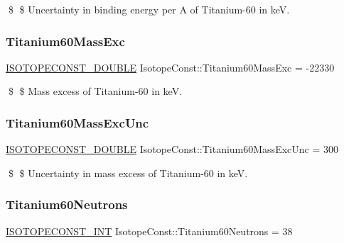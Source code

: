 \$ \$ Uncertainty in binding energy per A of Titanium-\/60 in keV. \mbox{\label{group___isotope_const-_titanium-_ti60_ga45d332f9e6dccb91611e66ee8d34ff87}} 
\subsubsection{\texorpdfstring{Titanium60\+Mass\+Exc}{Titanium60MassExc}}
{\footnotesize\ttfamily \mbox{\hyperlink{group___isotope_const-_macros_ga8f45a7272ce02c0b4c65c44636ed719a}{I\+S\+O\+T\+O\+P\+E\+C\+O\+N\+S\+T\+\_\+\+D\+O\+U\+B\+LE}} Isotope\+Const\+::\+Titanium60\+Mass\+Exc = -\/22330}

\$ \$ Mass excess of Titanium-\/60 in keV. \mbox{\label{group___isotope_const-_titanium-_ti60_ga9fed32165e86d8d64e4fe741c67272ba}} 
\subsubsection{\texorpdfstring{Titanium60\+Mass\+Exc\+Unc}{Titanium60MassExcUnc}}
{\footnotesize\ttfamily \mbox{\hyperlink{group___isotope_const-_macros_ga8f45a7272ce02c0b4c65c44636ed719a}{I\+S\+O\+T\+O\+P\+E\+C\+O\+N\+S\+T\+\_\+\+D\+O\+U\+B\+LE}} Isotope\+Const\+::\+Titanium60\+Mass\+Exc\+Unc = 300}

\$ \$ Uncertainty in mass excess of Titanium-\/60 in keV. \mbox{\label{group___isotope_const-_titanium-_ti60_gaaca5084dd865e04dcb7c35b34205d5a7}} 
\subsubsection{\texorpdfstring{Titanium60\+Neutrons}{Titanium60Neutrons}}
{\footnotesize\ttfamily \mbox{\hyperlink{group___isotope_const-_macros_ga5f18360b3e99483a35c32d789e62621c}{I\+S\+O\+T\+O\+P\+E\+C\+O\+N\+S\+T\+\_\+\+I\+NT}} Isotope\+Const\+::\+Titanium60\+Neutrons = 38}

